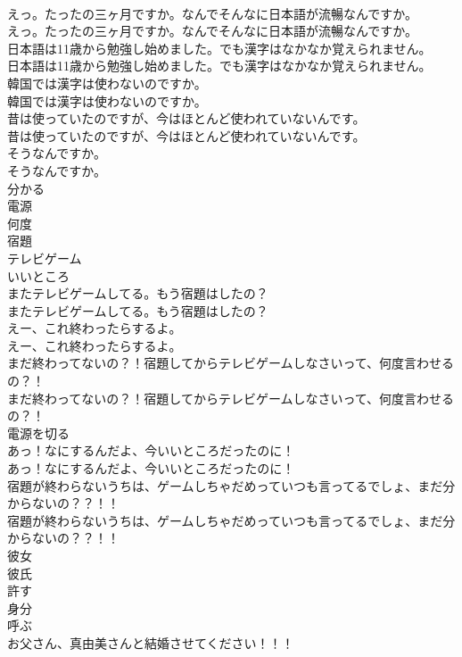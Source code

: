 \documentclass[8pt]{extreport}
\begin{document}
\begin{CJK}{UTF8}{min}
\\	えっ。たったの三ヶ月ですか。なんでそんなに日本語が流暢なんですか。	
\\	えっ。たったの三ヶ月ですか。なんでそんなに日本語が流暢なんですか。 
\\	日本語は11歳から勉強し始めました。でも漢字はなかなか覚えられません。	
\\	日本語は11歳から勉強し始めました。でも漢字はなかなか覚えられません。 
\\	韓国では漢字は使わないのですか。	
\\	韓国では漢字は使わないのですか。 
\\	昔は使っていたのですが、今はほとんど使われていないんです。	
\\	昔は使っていたのですが、今はほとんど使われていないんです。 
\\	そうなんですか。	
\\	そうなんですか。 
\\	分かる
\\	電源
\\	何度
\\	宿題
\\	テレビゲーム
\\	いいところ
\\	またテレビゲームしてる。もう宿題はしたの？	
\\	またテレビゲームしてる。もう宿題はしたの？ 
\\	えー、これ終わったらするよ。	
\\	えー、これ終わったらするよ。 
\\	まだ終わってないの？！宿題してからテレビゲームしなさいって、何度言わせるの？！	
\\	まだ終わってないの？！宿題してからテレビゲームしなさいって、何度言わせるの？！ 
\\	電源を切る	
\\	あっ！なにするんだよ、今いいところだったのに！	
\\	あっ！なにするんだよ、今いいところだったのに！ 
\\	宿題が終わらないうちは、ゲームしちゃだめっていつも言ってるでしょ、まだ分からないの？？！！	
\\	宿題が終わらないうちは、ゲームしちゃだめっていつも言ってるでしょ、まだ分からないの？？！！ 
\\	彼女
\\	彼氏
\\	許す
\\	身分
\\	呼ぶ
\\	お父さん、真由美さんと結婚させてください！！！	

\end{CJK}
\end{document}
